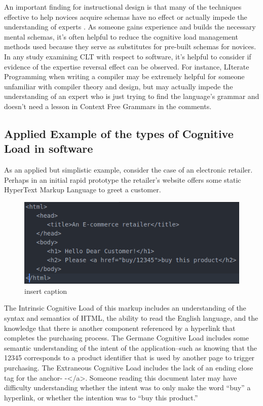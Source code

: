 An important finding for instructional design is that many of the techniques effective to help novices acquire schemas have no effect or actually impede the understanding of experts \cite{Kalyuga2003}. As someone gains experience and builds the necessary mental schemas, it’s often helpful to reduce the cognitive load management methods used because they serve as substitutes for pre-built schemas for novices. In any study examining CLT with respect to software, it’s helpful to consider if evidence of the expertise reversal effect can be observed. For instance, LIterate Programming when writing a compiler may be extremely helpful for someone unfamiliar with compiler theory and design, but may actually impede the understanding of an expert who is just trying to find the language’s grammar and doesn’t need a lesson in Context Free Grammars in the comments. 

\subsection{Applied Example of the types of Cognitive Load in software}

As an applied but simplistic example, consider the case of an electronic retailer. Perhaps in an initial rapid prototype the retailer’s website offers some static HyperText Markup Language to greet a customer. 

\begin{figure}[H]
	\centering
	\includegraphics[scale=.7]{code1}
	\caption{insert caption}
\end{figure}

The Intrinsic Cognitive Load of this markup includes an understanding of the syntax and semantics of HTML, the ability to read the English language, and the knowledge that there is another component referenced by a hyperlink that completes the purchasing process. The Germane Cognitive Load includes some semantic understanding of the intent of the application--such as knowing that the 12345 corresponds to a product identifier that is used by another page to trigger purchasing. The Extraneous Cognitive Load includes the lack of an ending close tag for the anchor- -\textless/a\textgreater. Someone reading this document later may have difficulty understanding whether the intent was to only make the word “buy” a hyperlink, or whether the intention was to “buy this product.”

